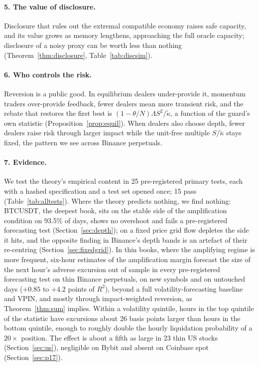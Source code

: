\documentclass[12pt]{article}
\theoremstyle{definition}
\theoremstyle{remark}
\begin{document}
\paragraph{5. The value of disclosure.} Disclosure that rules out the extremal compatible economy raises safe capacity, and its value grows as memory lengthens, approaching the full oracle capacity; disclosure of a noisy proxy can be worth less than nothing (Theorem~\ref{thm:disclosure}, Table~\ref{tab:discsim}).

\paragraph{6. Who controls the risk.} Reversion is a public good. In equilibrium dealers under-provide it, momentum traders over-provide feedback, fewer dealers mean more transient risk, and the rebate that restores the first best is $(1-\theta/N)\Lambda S^2/\tilde\kappa$, a function of the guard's own statistic (Proposition~\ref{prop:equil}). When dealers also choose depth, fewer dealers raise risk through larger impact while the unit-free multiple $S/\tilde\kappa$ stays fixed, the pattern we see across Binance perpetuals.

\paragraph{7. Evidence.} We test the theory's empirical content in 25 pre-registered primary tests, each with a hashed specification and a test set opened once; 15 pass (Table~\ref{tab:alltests}). Where the theory predicts nothing, we find nothing: BTCUSDT, the deepest book, sits on the stable side of the amplification condition on 93.5\% of days, shows no overshoot and fails a pre-registered forecasting test (Section~\ref{sec:depth}); on a fixed price grid flow depletes the side it hits, and the opposite finding in Binance's depth bands is an artefact of their re-centring (Section~\ref{sec:fixedgrid}). In thin books, where the amplifying regime is more frequent, six-hour estimates of the amplification margin forecast the size of the next hour's adverse excursion out of sample in every pre-registered forecasting test on thin Binance perpetuals, on new symbols and on untouched days ($+0.85$ to $+4.2$ points of $R^2$), beyond a full volatility-forecasting baseline and VPIN, and mostly through impact-weighted reversion, as Theorem~\ref{thm:sum} implies. Within a volatility quintile, hours in the top quintile of the statistic have excursions about 26 basis points larger than hours in the bottom quintile, enough to roughly double the hourly liquidation probability of a $20\times$ position. The effect is about a fifth as large in 23 thin US stocks (Section~\ref{sec:us}), negligible on Bybit and absent on Coinbase spot (Section~\ref{sec:p17}).
\end{document}
